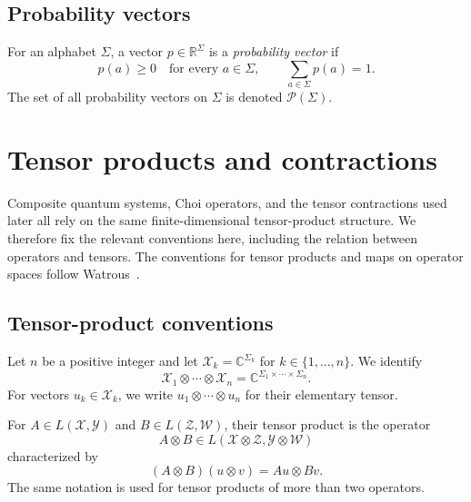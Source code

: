 \documentclass[
    aps,
    pra,
    reprint,
    superscriptaddress,
    nofootinbib
]{revtex4-2}
\theoremstyle{definition}
\theoremstyle{plain}
\begin{document}
\subsection{Probability vectors}

For an alphabet $\Sigma$, a vector $p\in\mathbb{R}^{\Sigma}$ is a
\emph{probability vector} if
\begin{equation}
    p(a)\geq 0\quad\text{for every }a\in\Sigma,
    \qquad
    \sum_{a\in\Sigma}p(a)=1.
\end{equation}
The set of all probability vectors on $\Sigma$ is denoted
$\mathcal{P}(\Sigma)$.

\section{Tensor products and contractions}
\label{sec:tensor-products}

Composite quantum systems, Choi operators, and the tensor contractions used
later all rely on the same finite-dimensional tensor-product structure. We
therefore fix the relevant conventions here, including the relation between
operators and tensors. The conventions for tensor products
and maps on operator spaces follow
Watrous~\cite[Secs.~1.1.1--1.1.2]{Watrous2018}.

\subsection{Tensor-product conventions}

Let $n$ be a positive integer and let
$\mathcal{X}_{k}=\mathbb{C}^{\Sigma_{k}}$ for
$k\in\{1,\ldots,n\}$. We identify
\begin{equation}
    \mathcal{X}_{1}\otimes\cdots\otimes\mathcal{X}_{n}
    =
    \mathbb{C}^{\Sigma_{1}\times\cdots\times\Sigma_{n}}.
\end{equation}
For vectors $u_k\in\mathcal{X}_k$, we write
$u_1\otimes\cdots\otimes u_n$ for their elementary tensor.

For $A\in L(\mathcal{X},\mathcal{Y})$ and
$B\in L(\mathcal{Z},\mathcal{W})$, their tensor product is the operator
\begin{equation}
    A\otimes B
    \in
    L(\mathcal{X}\otimes\mathcal{Z},
      \mathcal{Y}\otimes\mathcal{W})
\end{equation}
characterized by
\begin{equation}
    (A\otimes B)(u\otimes v)
    =
    Au\otimes Bv.
\end{equation}
The same notation is used for tensor products of more than two operators.
\end{document}

